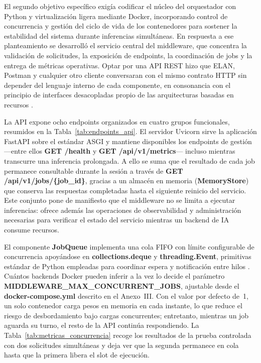 El segundo objetivo específico exigía codificar el núcleo del orquestador con Python y virtualización ligera mediante Docker, incorporando control de concurrencia y gestión del ciclo de vida de los contenedores para sostener la estabilidad del sistema durante inferencias simultáneas. En respuesta a ese planteamiento se desarrolló el servicio central del middleware, que concentra la validación de solicitudes, la exposición de endpoints, la coordinación de jobs y la entrega de métricas operativas. Optar por una API REST hizo que ELAN, Postman y cualquier otro cliente conversaran con el mismo contrato HTTP sin depender del lenguaje interno de cada componente, en consonancia con el principio de interfaces desacopladas propio de las arquitecturas basadas en recursos \cite{fielding2000rest,fastapi2026features}.

La API expone ocho endpoints organizados en cuatro grupos funcionales, resumidos en la Tabla~\ref{tab:endpoints_api}. El servidor Uvicorn sirve la aplicación FastAPI sobre el estándar ASGI y mantiene disponibles los endpoints de gestión ---entre ellos \textbf{GET /health} y \textbf{GET /api/v1/metrics}--- incluso mientras transcurre una inferencia prolongada. A ello se suma que el resultado de cada job permanece consultable durante la sesión a través de \textbf{GET /api/v1/jobs/\{job\_id\}}, gracias a un almacén en memoria (\textbf{MemoryStore}) que conserva las respuestas completadas hasta el siguiente reinicio del servicio. Este conjunto pone de manifiesto que el middleware no se limita a ejecutar inferencias: ofrece además las operaciones de observabilidad y administración necesarias para verificar el estado del servicio mientras un backend de IA consume recursos.

El componente \textbf{JobQueue} implementa una cola FIFO con límite configurable de concurrencia apoyándose en \textbf{collections.deque} y \textbf{threading.Event}, primitivas estándar de Python empleadas para coordinar espera y notificación entre hilos \cite{python_threading}. Cuántos backends Docker pueden inferir a la vez lo decide el parámetro \textbf{MIDDLEWARE\_\allowbreak{}MAX\_\allowbreak{}CONCURRENT\_\allowbreak{}JOBS}, ajustable desde el \textbf{docker-compose.yml} descrito en el Anexo~III. Con el valor por defecto de~1, un solo contenedor carga pesos en memoria en cada instante, lo que reduce el riesgo de desbordamiento bajo cargas concurrentes; entretanto, mientras un job aguarda su turno, el resto de la API continúa respondiendo. La Tabla~\ref{tab:metricas_concurrencia} recoge los resultados de la prueba controlada con dos solicitudes simultáneas y deja ver que la segunda permanece en cola hasta que la primera libera el slot de ejecución.

